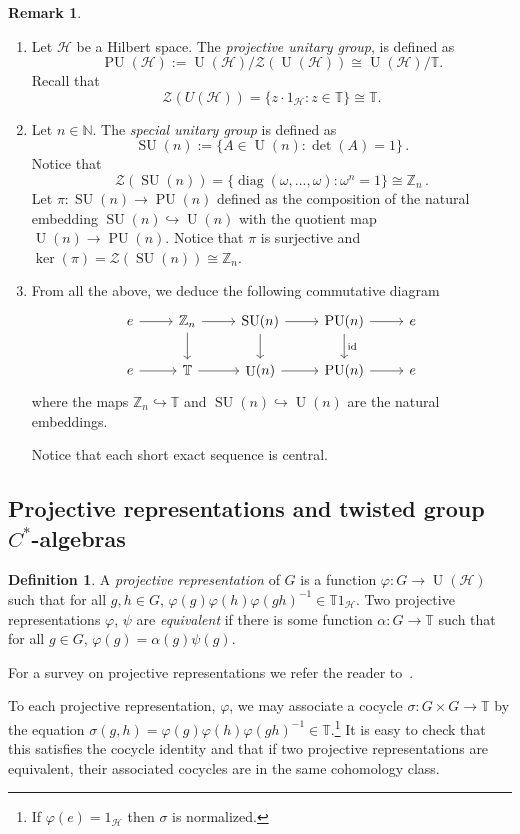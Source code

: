 \documentclass{amsart}
\theoremstyle{definition}
\newtheorem{remark}[theorem]{Remark}
\newtheorem{definition}[theorem]{Definition}
\newcommand{\Z}{\mathbb{Z}}
\newcommand{\N}{\mathbb{N}}
\newcommand{\TT}{\mathbb{T}}
\newcommand{\ZZ}{\mathcal{Z}}
\DeclareMathOperator{\id}{id}
\DeclareMathOperator{\diag}{diag}
\DeclareMathOperator{\SU}{SU}
\DeclareMathOperator{\U}{U}
\DeclareMathOperator{\PU}{PU}
\newcommand{\mc}{\mathcal}
\begin{document}
\begin{remark}\label{PU(N)extension}
\begin{enumerate}
    \item Let $\mc{H}$ be a Hilbert space. The {\em projective unitary group}, is defined as $$\PU(\mc{H}):=\U(\mc{H})/\ZZ(\U(\mc{H}))\cong\U(\mc{H})/\TT.$$
    Recall that $$\ZZ(U(\mc{H}))=\{z\cdot 1_{\mc{H}}:z\in \TT\}\cong \TT. $$
\item Let $n\in \N$. The \emph{special unitary group} is defined as $$\SU(n):=\{A\in \U(n): \det(A)=1\}\,.$$ Notice that $$\ZZ(\SU(n))=\{\diag(\omega,...,\omega):\omega^n=1\}\cong \Z_n\,.$$
Let $\pi\colon\SU(n)\rightarrow \PU(n)$ defined as the composition of the natural embedding $\SU(n)\hookrightarrow \U(n)$ with the quotient map $\U(n)\rightarrow \PU(n)$. Notice that $\pi$ is surjective and $\ker(\pi)=\ZZ(\SU(n))\cong \Z_n$.

\item From all the above, we deduce the following commutative diagram
$$\begin{tikzcd}
e\arrow{r}&\Z_n\arrow{r}\arrow[d]&\SU(n)\arrow{d}\arrow{r}&\PU(n)\arrow{r}\arrow[d,"\id"]&e\\
e\arrow{r}&\TT\arrow{r}&\U(n)\arrow{r}&\PU(n)\arrow{r}&e
\end{tikzcd}$$
where the maps $\Z_n\hookrightarrow \TT$ and $\SU(n)\hookrightarrow \U(n)$ are the natural embeddings. \par
Notice that each short exact sequence is central.
\end{enumerate}
\end{remark} 
\subsection{Projective representations and twisted group $C^*$-algebras}

\begin{definition}
A {\em projective representation} of $G$ is a function $\varphi \colon G\rightarrow\U(\mc{H})$ such that for all $g,h\in G$, $\varphi(g)\varphi(h)\varphi(gh)^{-1}\in\TT1_{\mc{H}}$. Two projective representations $\varphi$, $\psi$ are {\em equivalent} if there is some function $\alpha \colon G\rightarrow \TT$ such that for all $g\in G$, $\varphi(g)=\alpha(g)\psi(g)$. 
\end{definition}
For a survey on projective representations we refer the reader to~\cite{projectiveRep}. \par
To each projective representation, $\varphi$, we may associate a cocycle $\sigma \colon G\times G\rightarrow\TT$ by the equation $\sigma(g,h)=\varphi(g)\varphi(h)\varphi(gh)^{-1}\in\TT$.\footnote{If $\varphi(e)=1_{\mc{H}}$ then $\sigma$ is normalized.} It is easy to check that this satisfies the cocycle identity and that if two projective representations are equivalent, their associated cocycles are in the same cohomology class.
\end{document}
